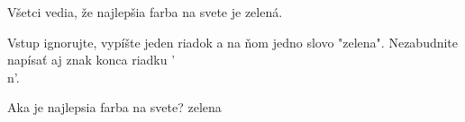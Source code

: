 




Všetci vedia, že najlepšia farba na svete je zelená.


Vstup ignorujte, vypíšte jeden riadok a na ňom jedno slovo "zelena".
Nezabudnite napísať aj znak konca riadku '\\n'.


\vstup
Aka je najlepsia farba na svete?
\vystup
zelena
\koniec


